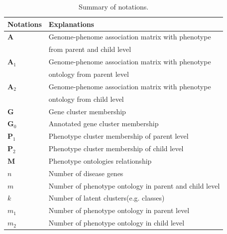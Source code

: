 \documentclass{bmcart}
\begin{document}
\begin{table}[t!]
 \caption{Summary of notations.}\label{Tab:Notations}
\begin{tabular}{|l|l|}
    \hline
    Notations & Explanations\\
    \hline\hline
    $\bm{A}$ & Genome-phenome association matrix with phenotype \\
    & from parent and child level\\
    $\bm{A}_1$ & Genome-phenome association matrix with phenotype\\
    & ontology from parent level\\
    $\bm{A}_2$ & Genome-phenome association matrix with phenotype\\
    & ontology from child level\\
    $\bm{G}$ & Gene cluster membership\\
    $\bm{G}_0$ & Annotated gene cluster membership\\
    $\bm{P}_1$ & Phenotype cluster membership of parent level\\
    $\bm{P}_2$ & Phenotype cluster membership of child level\\
    $\bm{M}$ & Phenotype ontologies relationship\\
    $n$ & Number of disease genes\\
    $m$ & Number of phenotype ontology in parent and child level\\
    $k$ & Number of latent clusters(e.g. classes)\\
    $m_1$ & Number of phenotype ontology in parent level\\
    $m_2$ & Number of phenotype ontology in child level\\
    \hline
  \end{tabular}
\end{table}
\end{document}
